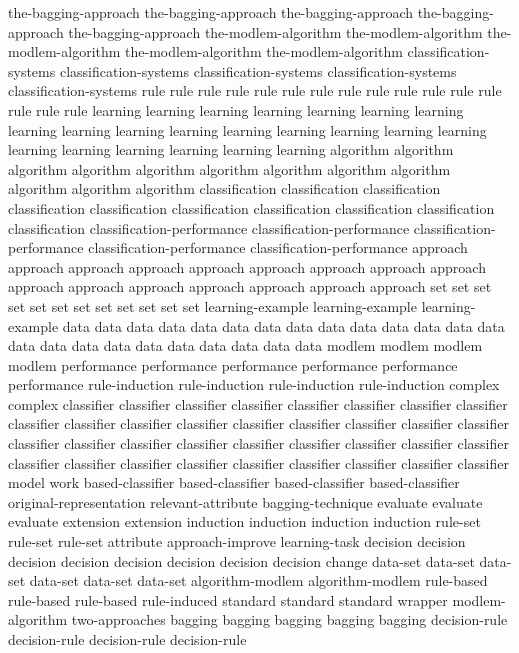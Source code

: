 the-bagging-approach	the-bagging-approach	the-bagging-approach	the-bagging-approach	the-bagging-approach	
the-modlem-algorithm	the-modlem-algorithm	the-modlem-algorithm	the-modlem-algorithm	the-modlem-algorithm	
classification-systems	classification-systems	classification-systems	classification-systems	classification-systems	
rule	rule	rule	rule	rule	rule	rule	rule	rule	rule	rule	rule	rule	rule	rule	rule	
learning	learning	learning	learning	learning	learning	learning	learning	learning	learning	learning	learning	learning	learning	learning	learning	learning	learning	learning	learning	learning	learning	
algorithm	algorithm	algorithm	algorithm	algorithm	algorithm	algorithm	algorithm	algorithm	algorithm	algorithm	algorithm	
classification	classification	classification	classification	classification	classification	classification	classification	classification	classification	
classification-performance	classification-performance	classification-performance	classification-performance	classification-performance	
approach	approach	approach	approach	approach	approach	approach	approach	approach	approach	approach	approach	approach	approach	approach	approach	
set	set	set	set	set	set	set	set	set	set	set	set	
learning-example	learning-example	learning-example	
data	data	data	data	data	data	data	data	data	data	data	data	data	data	data	data	data	data	data	data	data	data	data	data	
modlem	modlem	modlem	modlem	
performance	performance	performance	performance	performance	performance	
rule-induction	rule-induction	rule-induction	rule-induction	
complex	complex	
classifier	classifier	classifier	classifier	classifier	classifier	classifier	classifier	classifier	classifier	classifier	classifier	classifier	classifier	classifier	classifier	classifier	classifier	classifier	classifier	classifier	classifier	classifier	classifier	classifier	classifier	classifier	classifier	classifier	classifier	classifier	classifier	classifier	classifier	classifier	
model	
work	
based-classifier	based-classifier	based-classifier	based-classifier	
original-representation	
relevant-attribute	
bagging-technique	
evaluate	evaluate	evaluate	
extension	extension	
induction	induction	induction	induction	
rule-set	rule-set	rule-set	
attribute	
approach-improve	
learning-task	
decision	decision	decision	decision	decision	decision	decision	decision	
change	
data-set	data-set	data-set	data-set	data-set	data-set	
algorithm-modlem	algorithm-modlem	
rule-based	rule-based	rule-based	
rule-induced	
standard	standard	standard	
wrapper	
modlem-algorithm	
two-approaches	
bagging	bagging	bagging	bagging	bagging	
decision-rule	decision-rule	decision-rule	decision-rule	
